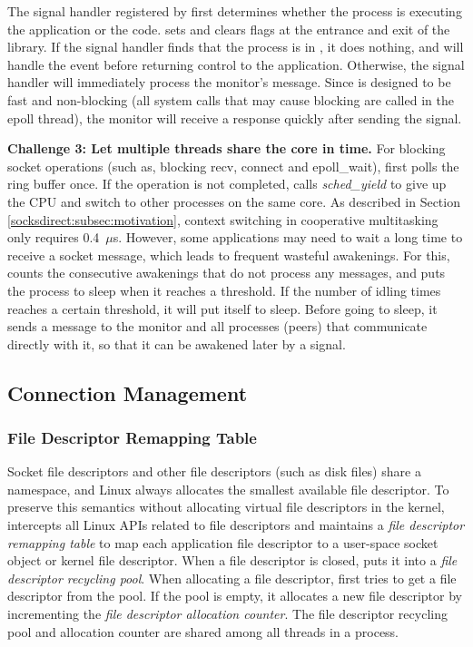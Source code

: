 The signal handler registered by \libipc{} first determines whether the process is executing the application or the \libipc{} code. \libipc{} sets and clears flags at the entrance and exit of the library. If the signal handler finds that the process is in \libipc, it does nothing, and \libipc{} will handle the event before returning control to the application. Otherwise, the signal handler will immediately process the monitor's message.
Since \libipc{} is designed to be fast and non-blocking (all system calls that may cause blocking are called in the epoll thread), the monitor will receive a response quickly after sending the signal.

\textbf {Challenge 3: Let multiple threads share the core in time.}
For blocking socket operations (such as, blocking recv, connect and epoll\_wait), \libipc{} first polls the ring buffer once. If the operation is not completed, \libipc{} calls \textit {sched\_yield} to give up the CPU and switch to other processes on the same core. As described in Section \ref {socksdirect:subsec:motivation}, context switching in cooperative multitasking only requires 0.4~$\mu$s. However, some applications may need to wait a long time to receive a socket message, which leads to frequent wasteful awakenings. For this, \libipc{} counts the consecutive awakenings that do not process any messages, and puts the process to sleep when it reaches a threshold.
If the number of \libipc{} idling times reaches a certain threshold, it will put itself to sleep. Before going to sleep, it sends a message to the monitor and all processes (peers) that communicate directly with it, so that it can be awakened later by a signal.


\subsection{Connection Management}
\label{socksdirect:subsec:connection-management}

\subsubsection{File Descriptor Remapping Table}
\label{socksdirect:subsubsec:fd-remapping-table}

Socket file descriptors and other file descriptors (such as disk files) share a namespace, and Linux always allocates the smallest available file descriptor. To preserve this semantics without allocating virtual file descriptors in the kernel, \libipc{} intercepts all Linux APIs related to file descriptors and maintains a \emph{file descriptor remapping table} to map each application file descriptor to a user-space socket object or kernel file descriptor. When a file descriptor is closed, \libipc{} puts it into a \emph{file descriptor recycling pool}. When allocating a file descriptor, \libipc{} first tries to get a file descriptor from the pool. If the pool is empty, it allocates a new file descriptor by incrementing the \emph{file descriptor allocation counter}. The file descriptor recycling pool and allocation counter are shared among all threads in a process.

